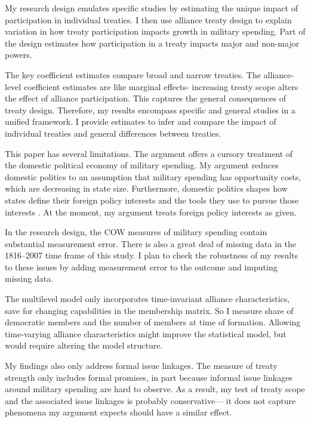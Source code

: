 \documentclass[12pt]{article}
\begin{document}
My research design emulates specific studies by estimating the unique impact of participation in individual treaties. 
I then use alliance treaty design to explain variation in how treaty participation impacts growth in military spending.
Part of the design estimates how participation in a treaty impacts major and non-major powers. 


The key coefficient estimates compare broad and narrow treaties. 
The alliance-level coefficient estimates are like marginal effects- increasing treaty scope alters the effect of alliance participation.
This captures the general consequences of treaty design. 
Therefore, my results encompass specific and general studies in a unified framework. 
I provide estimates to infer and compare the impact of individual treaties and general differences between treaties. 


This paper has several limitations.
The argument offers a cursory treatment of the domestic political economy of military spending. 
My argument reduces domestic politics to an assumption that military spending has opportunity costs, which are decreasing in state size. 
Furthermore, domestic politics shapes how states define their foreign policy interests and the tools they use to pursue those interests \citep{Fordham1998, Fordham2011, Narizny2007}.
At the moment, my argument treats foreign policy interests as given.  


In the research design, the COW measures of military spending contain substantial measurement error. 
There is also a great deal of missing data in the 1816--2007 time frame of this study. 
I plan to check the robustness of my results to these issues by adding measurement error to the outcome and imputing missing data.


The multilevel model only incorporates time-invariant alliance characteristics, save for changing capabilities in the membership matrix. 
So I measure share of democratic members and the number of members at time of formation. 
Allowing time-varying alliance characteristics might improve the statistical model, but would require altering the model structure. 


My findings also only address formal issue linkages. 
The measure of treaty strength only includes formal promises, in part because informal issue linkages around military spending are hard to observe. 
As a result, my test of treaty scope and the associated issue linkages is probably conservative--- it does not capture phenomena my argument expects should have a similar effect. 
\end{document}
